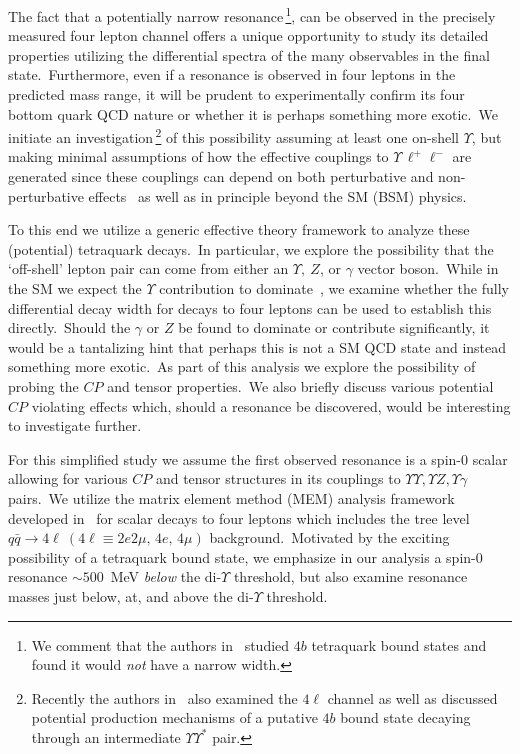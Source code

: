 \documentclass[nofootinbib,twocolumn,prl,preprintnumbers]{revtex4-1}
\begin{document}
The fact that a potentially narrow resonance\,\footnote{We comment that the authors in~\cite{Anwar:2017toa} studied $4b$ tetraquark bound states and found it would \emph{not} have a narrow width.}, can be observed in the precisely measured four lepton channel offers a unique opportunity to study its detailed properties utilizing the differential spectra of the many observables in the final state.~Furthermore, even if a resonance is observed in four leptons in the predicted mass range, it will be prudent to experimentally confirm its  four bottom quark QCD nature or whether it is perhaps something more exotic.~We initiate an investigation\,\footnote{Recently the authors in~\cite{Eichten:2017ual} also examined the $4\ell$ channel as well as discussed potential production mechanisms of a putative $4b$ bound state decaying through an intermediate $\Upsilon\Upsilon^\ast$ pair.}
of this possibility assuming at least one on-shell $\Upsilon$, but making minimal assumptions of how the effective couplings to $\Upsilon \,\ell^+\ell^-$ are generated since these couplings can depend on both perturbative and non-perturbative effects~\cite{Wang:2017jtz} as well as in principle beyond the SM (BSM) physics.

To this end we utilize a generic effective theory framework to analyze these (potential) tetraquark decays.~In particular, we explore the possibility that the `off-shell' lepton pair can come from either an $\Upsilon,~Z$, or $\gamma$ vector boson.~While in the SM we expect the $\Upsilon$ contribution to dominate~\cite{Bai:2016int,Eichten:2017ual}, we examine whether the fully differential decay width for decays to four leptons can be used to establish this directly.~Should the $\gamma$ or $Z$ be found to dominate or contribute significantly, it would be a tantalizing hint that perhaps this is not a SM QCD state and instead something more exotic.~As part of this analysis we explore the possibility of probing the $CP$ and tensor properties.~We also briefly discuss various potential $CP$ violating effects which, should a resonance be discovered, would be interesting to investigate further.

For this simplified study we assume the first observed resonance is a spin-0 scalar allowing for various $CP$ and tensor structures in its couplings to $\Upsilon\Upsilon,\Upsilon Z,\Upsilon\gamma$ pairs.~We utilize the matrix element method (MEM) analysis framework developed in~\cite{Chen:2012jy,Chen:2013ejz,Chen:2014pia,Chen:2014gka,Chen:2014hqs,Falkowski:2014ffa,Chen:2015iha} for scalar decays to four leptons which includes the tree level $q\bar{q} \to 4\ell~(4\ell \equiv 2e2\mu,\,4e,\,4\mu)$ background.~Motivated by the exciting possibility of a tetraquark bound state, we emphasize in our analysis a spin-0 resonance $\sim 500$~MeV \emph{below} the di-$\Upsilon$ threshold, but also examine  resonance masses just below, at, and above the di-$\Upsilon$ threshold.
\end{document}
